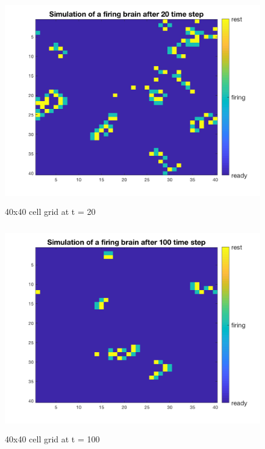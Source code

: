 \documentclass[12pt]{article}
\begin{document}
\begin{figure}[H] %
\centering
\includegraphics[width = 12 cm, height = 9cm]{fire20.png}
\caption{40x40 cell grid at t = 20}
\label{fig:fire20}
\end{figure}

\begin{figure}[H] %
\centering
\includegraphics[width = 12 cm, height = 9cm]{fire100.png}
\caption{40x40 cell grid at t = 100}
\label{fig:fire100}
\end{figure}
\end{document}

